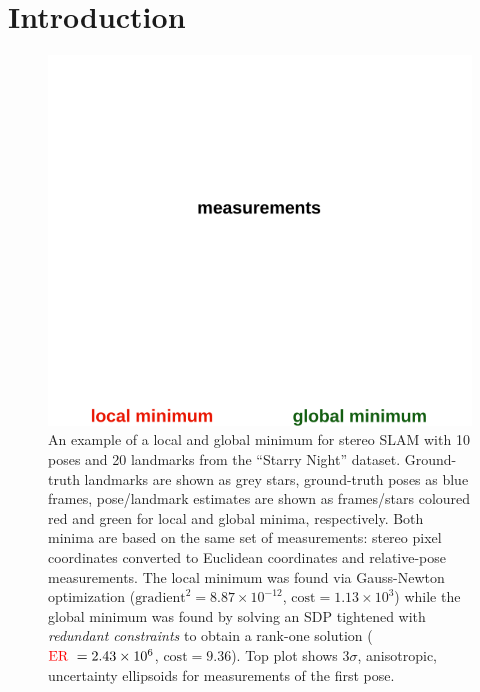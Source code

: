 \documentclass[lettersize,journal]{IEEEtran}
\newcommand{\rev}[1]{\color{red}{#1}\color{black}}
\begin{document}
\begin{IEEEkeywords}
	\rev{Localization, SLAM, Anisotropic, Certifiable, Optimization.}
\end{IEEEkeywords}

\section{Introduction}
\begin{figure}[!t]
	\centering
	\vspace*{-0.05in}
	\includegraphics[width=\columnwidth]{figs/slam_local_min}
	\vspace*{-0.3in}
	\caption{An example of a local and global minimum for stereo SLAM with 10 poses and 20 landmarks from the ``Starry Night'' dataset. Ground-truth landmarks are shown as grey stars, ground-truth poses as blue frames, pose/landmark estimates are shown as frames/stars coloured red and green for local and global minima, respectively. Both minima are based on the same set of measurements: stereo pixel coordinates converted to Euclidean coordinates and relative-pose measurements. The local minimum was found via Gauss-Newton optimization ($\mbox{gradient}^2=8.87\times10^{-12}$, $\mbox{cost}=1.13\times10^3$) while the global minimum was found by solving an SDP tightened with \emph{redundant constraints} to obtain a rank-one solution ($\mbox{\rev{ER }}=2.43\times10^6$, $\mbox{cost}=9.36$). Top plot shows 3$\sigma$, anisotropic, uncertainty ellipsoids for measurements of the first pose.}
	\vspace*{-0.22in}
	\label{fig:slam_local_min}
\end{figure}
\end{document}
